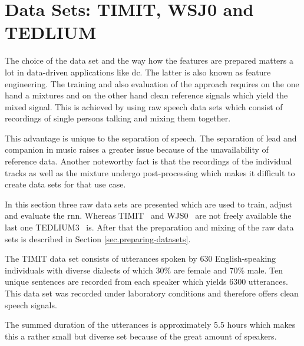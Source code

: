 \section{Data Sets: TIMIT, WSJ0 and TEDLIUM}\label{sec.datasets}
The choice of the data set and the way how the features are prepared matters a lot in data-driven applications like \gls{dc}. The latter is also known as feature engineering. %
The training and also evaluation of the approach requires on the one hand a mixtures and on the other hand clean reference signals which yield the mixed signal. This is achieved by using raw speech data sets which consist of recordings of single persons talking and mixing them together.

This advantage is unique to the separation of speech. The separation of lead and companion in music raises a greater issue because of the unavailability of reference data. Another noteworthy fact is that the recordings of the individual tracks as well as the mixture undergo post-processing which makes it difficult to create data sets for that use case.~\cite[p.~14]{Rafii2018}

In this section three raw data sets are presented which are used to train, adjust and evaluate the \gls{rnn}. Whereas TIMIT~\cite{Garofolo1993} and WJS0~\cite{Garofolo1994} are not freely available the last one TEDLIUM3~\cite{Hernandez2018} is.
After that the preparation and mixing of the raw data sets is described in Section \ref{sec.preparing-datasets}.

The TIMIT data set consists of utterances spoken by 630 English-speaking individuals with diverse dialects of which 30\% are female and 70\% male. Ten unique sentences are recorded from each speaker which yields 6300 utterances. This data set was recorded under laboratory conditions and therefore offers clean speech signals.~\cite[Documentation]{Garofolo1993}

The summed duration of the utterances is approximately 5.5 hours which makes this a rather small but diverse set because of the great amount of speakers.

